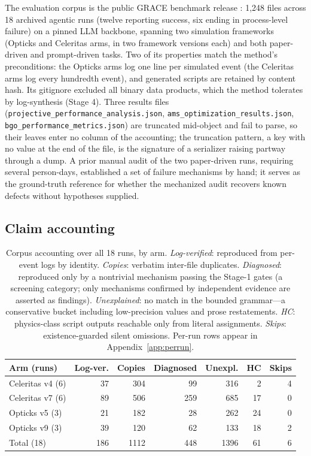 \documentclass{article}
\begin{document}
The evaluation corpus is the public GRACE benchmark release \citep{gracedata}: 1{,}248 files across 18 archived agentic runs (twelve reporting success, six ending in process-level failure) on a pinned LLM backbone, spanning two simulation frameworks (Opticks and Celeritas arms, in two framework versions each) and both paper-driven and prompt-driven tasks. Two of its properties match the method's preconditions: the Opticks arms log one line per simulated event (the Celeritas arms log every hundredth event), and generated scripts are retained by content hash. Its gitignore excluded all binary data products, which the method tolerates by log-synthesis (Stage 4). Three results files (\texttt{projective\_performance\_analysis.json}, \texttt{ams\_optimization\_results.json}, \texttt{bgo\_performance\_metrics.json}) are truncated mid-object and fail to parse, so their leaves enter no column of the accounting; the truncation pattern, a key with no value at the end of the file, is the signature of a serializer raising partway through a dump. A prior manual audit of the two paper-driven runs, requiring several person-days, established a set of failure mechanisms by hand; it serves as the ground-truth reference for whether the mechanized audit recovers known defects without hypotheses supplied.

\subsection{Claim accounting}

\begin{table}[t]
\centering
\caption{Corpus accounting over all 18 runs, by arm. \emph{Log-verified}: reproduced from per-event logs by identity. \emph{Copies}: verbatim inter-file duplicates. \emph{Diagnosed}: reproduced only by a nontrivial mechanism passing the Stage-1 gates (a screening category; only mechanisms confirmed by independent evidence are asserted as findings). \emph{Unexplained}: no match in the bounded grammar---a conservative bucket including low-precision values and prose restatements. \emph{HC}: physics-class script outputs reachable only from literal assignments. \emph{Skips}: existence-guarded silent omissions. Per-run rows appear in Appendix~\ref{app:perrun}.}
\label{tab:accounting}
\begin{tabular}{lrrrrrr}
\toprule
Arm (runs) & Log-ver. & Copies & Diagnosed & Unexpl. & HC & Skips \\
\midrule
Celeritas v4 (6) & 37 & 304 & 99 & 316 & 2 & 4 \\
Celeritas v7 (6) & 89 & 506 & 259 & 685 & 17 & 0 \\
Opticks v5 (3)   & 21 & 182 & 28 & 262 & 24 & 0 \\
Opticks v9 (3)   & 39 & 120 & 62 & 133 & 18 & 2 \\
\midrule
Total (18)       & 186 & 1112 & 448 & 1396 & 61 & 6 \\
\bottomrule
\end{tabular}
\end{table}
\end{document}
